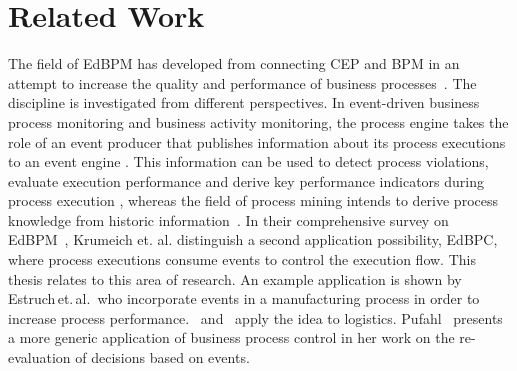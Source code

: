 \chapter{Related Work}\label{ch:relatedwork}


The field of \acf{EdBPM} has developed from connecting \ac{CEP} and \ac{BPM} in an attempt to increase the quality and performance of business processes~\cite{luckham2008power}.
The discipline is investigated from different perspectives.
In event-driven business process monitoring and business activity monitoring, the process engine takes the role of an event producer that publishes information about its process executions to an event engine \cite{baumgrass2014bpmn, herzberg2013improving, bulow2013monitoring}. 
This information can be used to detect process violations, evaluate execution performance and derive key performance indicators during process execution \cite{janiesch2011blueprint, janiesch:poc-eventdriven-bam}, whereas the field of process mining intends to derive process knowledge from historic information~\cite{tiwari2008review}.
In their comprehensive survey on \ac{EdBPM}~\cite{Krumeich2014EventDrivenBP}, Krumeich et. al. distinguish a second application possibility, \acf{EdBPC}, where process executions consume events to control the execution flow. This thesis relates to this area of research.
An example application is shown by Estruch\,et.\,al.\,\cite{estruch2012event} who incorporate events in a manufacturing process in order to increase process performance. \cite{Cabanillas2014}~and~\cite{Baumgrass2016} apply the idea to logistics.
Pufahl~\cite{Pufahl2017} presents a more generic application of business process control in her work on the re-evaluation of decisions based on events.

